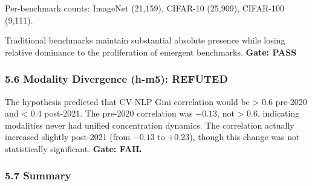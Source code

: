\begin{table}[htbp]
\centering
{}
\end{table}

Per-benchmark counts: ImageNet (21,159), CIFAR-10 (25,909), CIFAR-100 (9,111).

Traditional benchmarks maintain substantial absolute presence while losing relative dominance to the proliferation of emergent benchmarks. \textbf{Gate: PASS}

\subsubsection{5.6 Modality Divergence (h-m5): REFUTED}

\begin{table}[htbp]
\centering
{}
\end{table}

The hypothesis predicted that CV-NLP Gini correlation would be > 0.6 pre-2020 and < 0.4 post-2021. The pre-2020 correlation was $-0.13$, not > 0.6, indicating modalities never had unified concentration dynamics. The correlation actually increased slightly post-2021 (from $-0.13$ to +0.23), though this change was not statistically significant. \textbf{Gate: FAIL}

\subsubsection{5.7 Summary}

